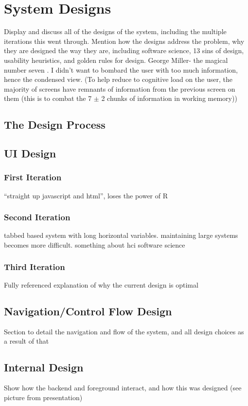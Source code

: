 \section{System Designs}
{\color{red} 
Display and discuss all of the designs of the system, including the multiple iterations this went through. Mention how the designs address the problem, why they are designed the way they are, including software science, 13 sins of design, usability heuristics, and golden rules for design.
}
{\color{red}
George Miller- the magical number seven \cite{miller1956magical}.
I didn't want to bombard the user with too much information, hence the condensed view. (To help reduce to cognitive load on the user, the majority of screens have remnants of information from the previous screen on them (this is to combat the 7 $\pm$ 2 chunks of information in working memory))}


\subsection{The Design Process}
{\color{red}  }



\subsection{UI Design}
{\color{red}  }


	\subsubsection{First Iteration}
	{\color{red} ``straight up javascript and html'', loses the power of R }



	\subsubsection{Second Iteration}
	{\color{red} tabbed based system with long horizontal variables. maintaining large systems becomes more difficult. something about hci software science }


	\subsubsection{Third Iteration}		
	{\color{red} Fully referenced explanation of why the current design is optimal }


\subsection{Navigation/Control Flow Design}		
{\color{red} Section to detail the navigation and flow of the system, and all design choices as a result of that }

\subsection{Internal Design}
{\color{red} Show how the backend and foreground interact, and how this was designed (see picture from presentation) }
